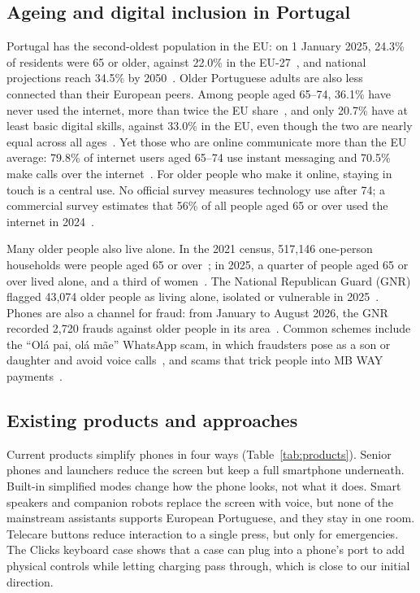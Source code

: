\documentclass[acmtog,nonacm]{acmart}
\begin{document}
\subsection{Ageing and digital inclusion in Portugal}
Portugal has the second-oldest population in the EU: on 1 January 2025, 24.3\% of residents were 65 or older, against 22.0\% in the EU-27~\cite{eurostat2025population}, and national projections reach 34.5\% by 2050~\cite{ine2025projecoes}. Older Portuguese adults are also less connected than their European peers. Among people aged 65--74, 36.1\% have never used the internet, more than twice the EU share~\cite{eurostat2025internet}, and only 20.7\% have at least basic digital skills, against 33.0\% in the EU, even though the two are nearly equal across all ages~\cite{eurostat2025digitalskills}. Yet those who are online communicate more than the EU average: 79.8\% of internet users aged 65--74 use instant messaging and 70.5\% make calls over the internet~\cite{eurostat2025activities}. For older people who make it online, staying in touch is a central use. No official survey measures technology use after 74; a commercial survey estimates that 56\% of all people aged 65 or over used the internet in 2024~\cite{marktest2024bareme}.

Many older people also live alone. In the 2021 census, 517,146 one-person households were people aged 65 or over~\cite{ine2024estruturas}; in 2025, a quarter of people aged 65 or over lived alone, and a third of women~\cite{eurostat2025livingalone}. The National Republican Guard (GNR) flagged 43,074 older people as living alone, isolated or vulnerable in 2025~\cite{gnr2025balanco}. Phones are also a channel for fraud: from January to August 2026, the GNR recorded 2,720 frauds against older people in its area~\cite{gnr2026censos}. Common schemes include the ``Ol\'a pai, ol\'a m\~ae'' WhatsApp scam, in which fraudsters pose as a son or daughter and avoid voice calls~\cite{tsf2023olapai}, and scams that trick people into MB WAY payments~\cite{sapo2025mbway}.

\subsection{Existing products and approaches}
Current products simplify phones in four ways (Table~\ref{tab:products}). Senior phones and launchers reduce the screen but keep a full smartphone underneath. Built-in simplified modes change how the phone looks, not what it does. Smart speakers and companion robots replace the screen with voice, but none of the mainstream assistants supports European Portuguese, and they stay in one room. Telecare buttons reduce interaction to a single press, but only for emergencies. The Clicks keyboard case shows that a case can plug into a phone's port to add physical controls while letting charging pass through, which is close to our initial direction.
\end{document}
